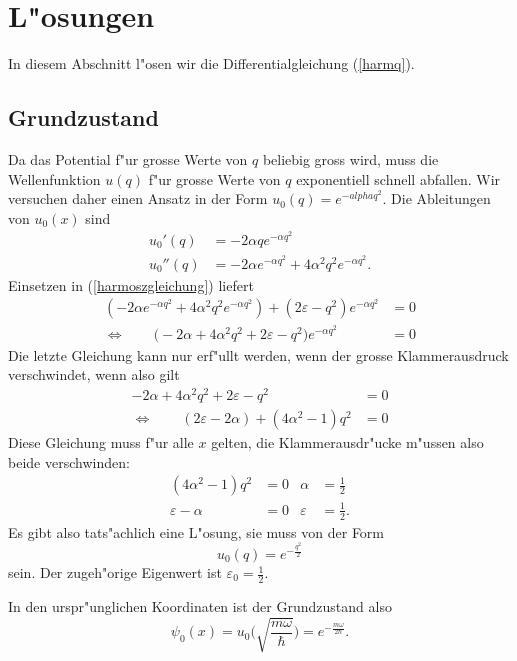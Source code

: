 \section{L"osungen}
In diesem Abschnitt l"osen wir die Differentialgleichung (\ref{harmq}).
\subsection{Grundzustand\label{hogrundzustand}}
Da das Potential f"ur grosse Werte von $q$ beliebig gross wird,
muss die Wellenfunktion $u(q)$ f"ur grosse Werte von $q$ exponentiell
schnell abfallen.
Wir versuchen daher einen Ansatz in der Form $u_0(q)=e^{-alpha q^2}$.
Die Ableitungen von
$u_0(x)$ sind
\begin{align*}
u_0'(q)&=-2\alpha qe^{-\alpha q^2}\\
u_0''(q)&=-2\alpha e^{-\alpha q^2}+4\alpha^2q^2e^{-\alpha q^2}.
\end{align*}
Einsetzen in (\ref{harmoszgleichung})  liefert
\begin{align*}
(-2\alpha e^{-\alpha q^2}+4\alpha^2q^2e^{-\alpha q^2})
+
(2\varepsilon - q^2)e^{-\alpha q^2}&=0
\\
\Leftrightarrow\qquad
\biggl(
-2\alpha +4\alpha^2q^2
+
2\varepsilon - q^2
\biggr)e^{-\alpha q^2}
&=0
\end{align*}
Die letzte Gleichung kann nur erf"ullt werden, wenn der grosse Klammerausdruck
verschwindet, wenn also gilt
\begin{align*}
-2\alpha +4\alpha^2q^2
+
2\varepsilon - q^2
&=0
\\
\Leftrightarrow\qquad
(2\varepsilon-2\alpha)
+
(4\alpha^2-1)q^2
&=0
\end{align*}
Diese Gleichung muss f"ur alle $x$ gelten, die Klammerausdr"ucke
m"ussen also beide verschwinden:
\begin{align*}
(4\alpha^2-1)q^2&=0
&
\alpha&=\frac12
\\
\varepsilon-\alpha&=0
&
\varepsilon&=\frac12.
\end{align*}
Es gibt also tats"achlich eine L"osung, sie muss von der Form
\[
u_0(q)=e^{-\frac{q^2}2}
\]
sein. Der zugeh"orige Eigenwert ist $\varepsilon_0=\frac12$.

In den urspr"unglichen Koordinaten ist der Grundzustand also
\begin{equation}
\psi_0(x)=u_0\biggl(\sqrt{\frac{m\omega}{\hbar}}\biggr)
=
e^{-\frac{m\omega}{2\hbar}}.
\label{grundzustandwellenfunktion}
\end{equation}

